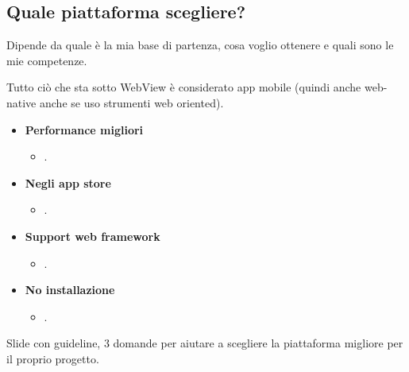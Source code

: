 \subsection{Quale piattaforma scegliere?}
\par Dipende da quale è la mia base di partenza, cosa voglio ottenere e quali sono le mie competenze.
\par Tutto ciò che sta sotto WebView è considerato app mobile (quindi anche web-native anche se uso strumenti web oriented).
\begin{itemize}
    \item \textbf{Performance migliori}
    \begin{itemize}
        \item .
    \end{itemize}
    \item \textbf{Negli app store}
    \begin{itemize}
        \item .
    \end{itemize}
    \item \textbf{Support web framework}
    \begin{itemize}
        \item .
    \end{itemize}
    \item \textbf{No installazione}
    \begin{itemize}
        \item .
    \end{itemize}
\end{itemize}
\par Slide con guideline, 3 domande per aiutare a scegliere la piattaforma migliore per il proprio progetto.